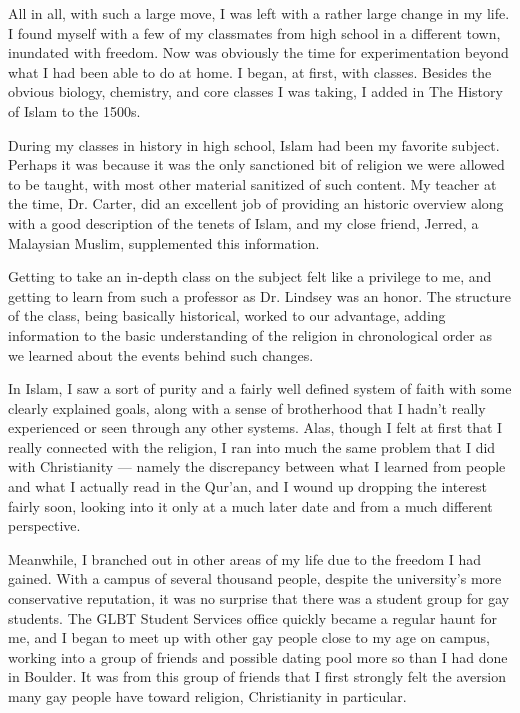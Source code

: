 \documentclass{book}
\begin{document}
All in all, with such a large move, I was left with a rather large change in my life.  I found myself with a few of my classmates from high school in a different town, inundated with freedom.  Now was obviously the time for experimentation beyond what I had been able to do at home.  I began, at first, with classes.  Besides the obvious biology, chemistry, and core classes I was taking, I added in The History of Islam to the 1500s.

During my classes in history in high school, Islam had been my favorite subject.  Perhaps it was because it was the only sanctioned bit of religion we were allowed to be taught, with most other material sanitized of such content.  My teacher at the time, Dr.  Carter, did an excellent job of providing an historic overview along with a good description of the tenets of Islam, and my close friend, Jerred, a Malaysian Muslim, supplemented this information.

Getting to take an in-depth class on the subject felt like a privilege to me, and getting to learn from such a professor as Dr.  Lindsey was an honor.  The structure of the class, being basically historical, worked to our advantage, adding information to the basic understanding of the religion in chronological order as we learned about the events behind such changes.

In Islam, I saw a sort of purity and a fairly well defined system of faith with some clearly explained goals, along with a sense of brotherhood that I hadn't really experienced or seen through any other systems.  Alas, though I felt at first that I really connected with the religion, I ran into much the same problem that I did with Christianity --- namely the discrepancy between what I learned from people and what I actually read in the Qur'an, and I wound up dropping the interest fairly soon, looking into it only at a much later date and from a much different perspective.

Meanwhile, I branched out in other areas of my life due to the freedom I had gained.  With a campus of several thousand people, despite the university's more conservative reputation, it was no surprise that there was a student group for gay students.  The GLBT Student Services office quickly became a regular haunt for me, and I began to meet up with other gay people close to my age on campus, working into a group of friends and possible dating pool more so than I had done in Boulder.  It was from this group of friends that I first strongly felt the aversion many gay people have toward religion, Christianity in particular.
\end{document}
